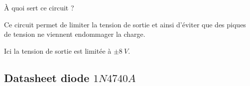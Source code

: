 \documentclass{../template/tp}
\begin{document}
\Question
{
    À quoi sert ce circuit ?
}{
    Ce circuit permet de limiter la tension de sortie et ainsi d'éviter que des piques de tension ne viennent endommager la charge.
    
    Ici la tension de sortie est limitée à $ \pm 8~V $.
}


\subsection*{Datasheet diode $ 1N4740A $}
 \newpage
\end{document}
